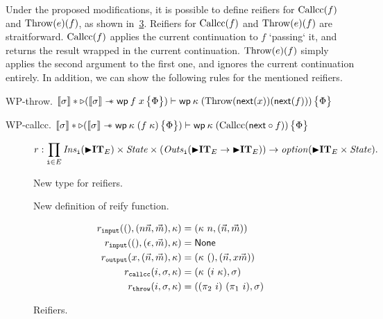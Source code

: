 Under the proposed modifications, it is possible to define reifiers
for $\mathrm{Callcc}(f)$ and $\mathrm{Throw}(e)(f)$, as shown
in~\cref{fig:control_reifiers}. Reifiers for $\mathrm{Callcc}(f)$ and
$\mathrm{Throw}(e)(f)$ are straitforward. $\mathrm{Callcc}(f)$ applies the current
continuation to $f$ `passing` it, and returns the result wrapped in
the current continuation. $\mathrm{Throw}(e)(f)$ simply applies the second
argument to the first one, and ignores the current continuation
entirely. In addition, we can show the following rules for the
mentioned reifiers.

\begin{lemma}{WP-throw.}
  \label{lem:wp_throw}
  $\sem{\sigma} \ast \later (\sem{\sigma} \wand \wpre{\eapp{f}{x}}{\Phi}) \vdash \wpre{\eapp{\kappa}{(\throwGT(\Next(x))(\Next(f)))}}{\Phi}$
\end{lemma}

\begin{lemma}{WP-callcc.}
  \label{lem:wp_callcc}
  $\sem{\sigma} \ast \later (\sem{\sigma} \wand \wpre{\eapp{\kappa}{(\eapp{f}{\kappa})}}{\Phi}) \vdash \wpre{\eapp{\kappa}{(\callccGT(\Next \circ f))}}{\Phi}$
\end{lemma}

\begin{figure}
  \[
    r : \prod_{{\mathtt i} \in E} \mathit{Ins}_{{\mathtt i}}(\mathord{\blacktriangleright} \mathbf{IT}_E) \times \mathit{State} \times (\mathit{Outs}_{{\mathtt i}}(\mathord{\blacktriangleright} \mathbf{IT}_E \rightarrow \mathord{\blacktriangleright} \mathbf{IT}_E)) \to \mathit{option}(\mathord{\blacktriangleright} \mathbf{IT}_E \times \mathit{State}).
  \]
  \caption{New type for reifiers.}
  \label{fig:different_reifiers}
\end{figure}

\begin{figure}
  \caption{New definition of reify function.}
  \label{fig:different_reify}
\end{figure}

\begin{figure}
  \begin{align*}
    r_{\mathtt{input}}((),(n\vec{n},\vec{m}),\kappa) &= (\kappa~n, (\vec{n},\vec{m}))\\
    r_{\mathtt{input}}((),(\epsilon,\vec{m}),\kappa) &= \textsf{None}\\
    r_{\mathtt{output}}(x,(\vec{n},\vec{m}),\kappa) &= (\kappa~(), (\vec{n},x\vec{m}))\\
    r_{\mathtt{callcc}} (i, \sigma, \kappa) &= (\kappa~(i~\kappa), \sigma)\\
    r_{\mathtt{throw}} (i, \sigma, \kappa) &= ((\pi_2~i)~(\pi_1~i), \sigma)
  \end{align*}
  \caption{Reifiers.}
  \label{fig:control_reifiers}
\end{figure}

